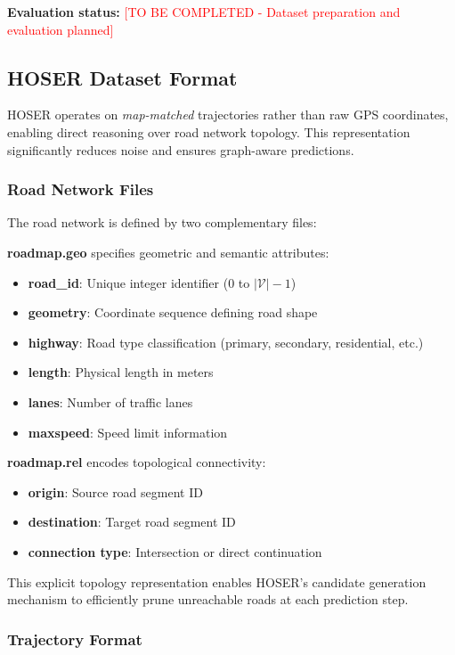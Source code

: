 \textbf{Evaluation status:} \textcolor{red}{[TO BE COMPLETED - Dataset preparation and evaluation planned]}

\subsection{HOSER Dataset Format}
\label{sec:data-format}

HOSER operates on \emph{map-matched} trajectories rather than raw GPS coordinates, enabling direct reasoning over road network topology. This representation significantly reduces noise and ensures graph-aware predictions.

\subsubsection{Road Network Files}

The road network is defined by two complementary files:

\textbf{roadmap.geo} specifies geometric and semantic attributes:
\begin{itemize}[noitemsep,topsep=0pt]
\item \textbf{road\_id}: Unique integer identifier (0 to $|\mathcal{V}| - 1$)
\item \textbf{geometry}: Coordinate sequence defining road shape
\item \textbf{highway}: Road type classification (primary, secondary, residential, etc.)
\item \textbf{length}: Physical length in meters
\item \textbf{lanes}: Number of traffic lanes
\item \textbf{maxspeed}: Speed limit information
\end{itemize}

\textbf{roadmap.rel} encodes topological connectivity:
\begin{itemize}[noitemsep,topsep=0pt]
\item \textbf{origin}: Source road segment ID
\item \textbf{destination}: Target road segment ID
\item \textbf{connection type}: Intersection or direct continuation
\end{itemize}

This explicit topology representation enables HOSER's candidate generation mechanism to efficiently prune unreachable roads at each prediction step.

\subsubsection{Trajectory Format}

